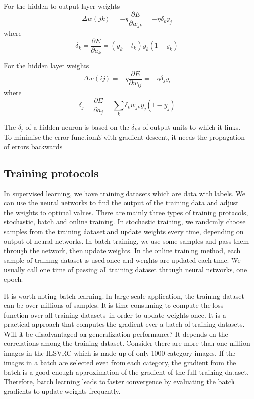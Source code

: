 For the hidden to output layer weights
\begin{equation}\label{eq:h2oBP}
\Delta w(jk) = -\eta \frac{\partial E}{\partial w_{jk}} = -\eta \delta_{k}y_{j}
\end{equation}
where $$\delta_{k} = \frac{\partial E}{\partial a_{k}} = (y_{k} - t_{k})y_{k}(1 - y_{k})$$

For the hidden layer weights
\begin{equation}\label{eq:hiddenBP}
\Delta w(ij) = -\eta \frac{\partial E}{\partial w_{ij}} = -\eta \delta_{j}y_{i}
\end{equation}
where $$\delta_{j} = \frac{\partial E}{\partial a_{j}} = \displaystyle\sum_{k} \delta_{k}w_{jk}y_{j}(1 - y_{j})$$

The $\delta_{j}$ of a hidden neuron is based on the $\delta_{k}$s of output units to which it links. To minimise the error function$E$ with gradient descent, it needs the propagation of errors backwards.

\subsection{Training protocols}

In supervised learning, we have training datasets which are data with labels. We can use the neural networks to find the output of the training data and adjust the weights to optimal values. There are mainly  three types of training protocols, stochastic, batch and online training. In stochastic training, we randomly choose samples from the training dataset and update weights every time, depending on output of neural networks. In batch training, we use some samples and pass them through the network, then update weights. In the online training method, each sample of training dataset is used once and weights are updated each time. We usually call one time of passing all training dataset through neural networks, one epoch.

It is worth noting batch learning. In large scale application, the training dataset can be over millions of samples. It is time consuming to compute the loss function over all training datasets, in order to update weights once. It is a practical approach that computes the gradient over a batch of training datasets. Will it be disadvantaged on generalization performance? It depends on the correlations among the training dataset. Consider there are more than one million images in the ILSVRC which is made up of only 1000 category images. If the images in a batch are selected even from each category, the gradient from the batch is a good enough approximation of the gradient of the full training dataset. Therefore, batch learning leads to faster convergence by evaluating the batch gradients to update weights frequently.

